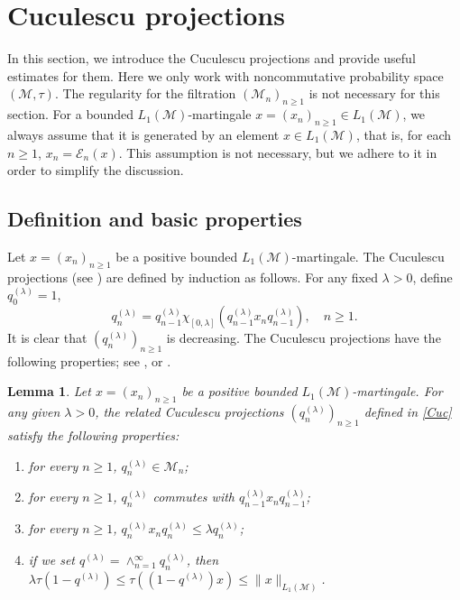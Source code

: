 \documentclass[11]{amsart}
\numberwithin{equation}{section}
\newtheorem{lemma}[theorem]{Lemma}
\begin{document}
\section{Cuculescu projections}\label{sec-Cucu}


In this section, we introduce the Cuculescu projections and provide useful estimates for them. Here we only work with noncommutative probability space $(\mathcal{M},\tau)$. The regularity for the filtration $(\mathcal{M}_n)_{n\geq1}$ is not necessary for this section. For a bounded $L_1(\mathcal{M})$-martingale $x=(x_n)_{n\geq1}\in L_1(\mathcal{M})$, we always assume that it is generated by an element $x\in L_1(\mathcal{M})$, that is, for each $n\geq1$, $x_n=\mathcal{E}_n(x)$. This assumption is not necessary, but we adhere to it in order to simplify the discussion. 

\subsection{Definition and basic properties}
Let $x=(x_n)_{n\geq1}$ be a positive bounded $L_1(\mathcal{M})$-martingale. The  Cuculescu projections (see \cite{Cu1971}) are defined by induction as follows.  For any fixed $\lambda>0$, define $q_0^{(\lambda)}=1$,
\begin{equation}\label{Cuc}
	 q_n^{(\lambda)}=q_{n-1}^{(\lambda)}\chi_{[0,\lambda]}(q_{n-1}^{(\lambda)}x_nq_{n-1}^{(\lambda)}),\quad n\geq1.
\end{equation}
It is clear that $(q_n^{(\lambda)})_{n\geq1}$ is decreasing. The  Cuculescu projections have the following properties;  see \cite{Cu1971}, \cite[Proposition 1.4]{PR2006}  or \cite[Proposition 2.3]{Rand2002}.


\begin{lemma}\label{Cuculescu}
Let $x=(x_n)_{n\geq1}$ be a positive bounded $L_1(\mathcal{M})$-martingale. For any given $\lambda>0$, the related Cuculescu projections  $(q_n^{(\lambda)})_{n\geq 1}$  defined in \eqref{Cuc}   satisfy the following properties:
	\begin{enumerate}[{\rm (i)}]
		\item for every $n\geq1 $, $q_n^{(\lambda)}\in \mathcal{M}_n $;
		
		\item for every $n\geq1 $, $q_n^{(\lambda)}$ commutes with $q_{n-1}^{(\lambda)}x_n q_{n-1}^{(\lambda)}$;
		
		\item for every $n\geq1 $, $q_n^{(\lambda)}x_nq_n^{(\lambda)}\leq \lambda q_n^{(\lambda)}$;
		
		\item if we set $q^{(\lambda)}= \wedge_{n=1}^{\infty} q_n^{(\lambda)}$, then
		$\lambda\tau(1-q^{(\lambda)})\leq \tau((1-q^{(\lambda)})x)\leq \|x\|_{L_1(\mathcal{M})}$.
	\end{enumerate}
\end{lemma}
\end{document}
